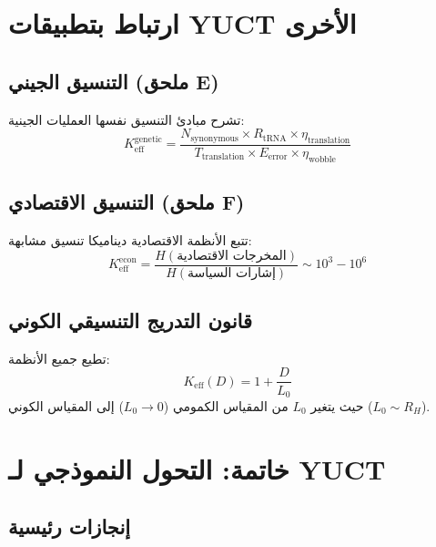 \documentclass[11pt,a4paper]{article}
\theoremstyle{remark}
\newcommand{\Keff}{K_{\mathrm{eff}}}
\begin{document}
	\section{ارتباط بتطبيقات YUCT الأخرى}
	\label{sec:connections}
	
	\subsection{التنسيق الجيني (ملحق E)}
	
	تشرح مبادئ التنسيق نفسها العمليات الجينية:
	\[
	K_{\text{eff}}^{\text{genetic}} = \frac{N_{\text{synonymous}} \times R_{\text{tRNA}} \times \eta_{\text{translation}}}{T_{\text{translation}} \times E_{\text{error}} \times \eta_{\text{wobble}}}
	\]
	
	\subsection{التنسيق الاقتصادي (ملحق F)}
	
	تتبع الأنظمة الاقتصادية ديناميكا تنسيق مشابهة:
	\[
	K_{\text{eff}}^{\text{econ}} = \frac{H(\text{المخرجات الاقتصادية})}{H(\text{إشارات السياسة})} \sim 10^3-10^6
	\]
	
	\subsection{قانون التدريج التنسيقي الكوني}
	
	تطيع جميع الأنظمة:
	\[
	\boxed{\Keff(D) = 1 + \frac{D}{L_0}}
	\]
	حيث يتغير $L_0$ من المقياس الكمومي ($L_0 \to 0$) إلى المقياس الكوني ($L_0 \sim R_H$).
	
	\section{خاتمة: التحول النموذجي لـ YUCT}
	\label{sec:conclusion}
	
	\subsection{إنجازات رئيسية}
	
\end{document}
